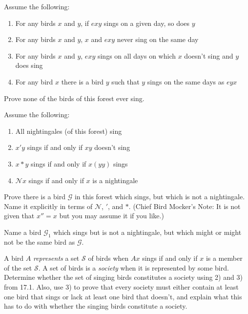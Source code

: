 \documentclass[12pt, letterpaper]{article}
\begin{document}
\begin{prob}{16.1} 
Assume the following:

\begin{enumerate}[label=\textbf{\arabic*)},itemsep=0mm]
  \item For any birds $x$ and $y$, if $exy$ sings on a given day, so does $y$
  \item For any birds $x$ and $y$, $x$ and $exy$ never sing on the same day
  \item For any birds $x$ and $y$, $exy$ sings on all days on which $x$ doesn't sing and $y$ does sing
  \item For any bird $x$ there is a bird $y$ such that $y$ sings on the same days as $eyx$
\end{enumerate}

\noindent Prove none of the birds of this forest ever sing.
\end{prob}

\begin{prob}{17.1}
Assume the following:

\begin{enumerate}[label=\textbf{\arabic*)},itemsep=0mm]
\item All nightingales (of this forest) sing
\item $x'y$ sings if and only if $xy$ doesn't sing
\item $x*y$ sings if and only if $x(yy)$ sings
\item $\mathcal{N}x$ sings if and only if $x$ is a nightingale
\end{enumerate}

Prove there is a bird $\mathcal{G}$ in this forest which sings, but which is not a nightingale. Name it explicitly in terms of $\mathcal{N}$, $'$, and $*$. (Chief Bird Mocker's Note: It is not given that $x'' = x$ but you may assume it if you like.)
\end{prob}

\begin{prob}{17.2} 
Name a bird $\mathcal{G}_1$ which sings but is not a nightingale, but which might or might not be the same bird as $\mathcal{G}$.
\end{prob}

\begin{prob}{17.3} 
A bird $A$ \emph{represents} a set $\mathcal{S}$ of birds when $Ax$ sings if and only if $x$ is a member of the set $\mathcal{S}$. A set of birds is a \emph{society} when it is represented by some bird. Determine whether the set of singing birds constitutes a society using 2) and 3) from 17.1. Also, use 3) to prove that every society must either contain at least one bird that sings or lack at least one bird that doesn't, and explain what this has to do with whether the singing birds constitute a society.
\end{prob}
\end{document}
